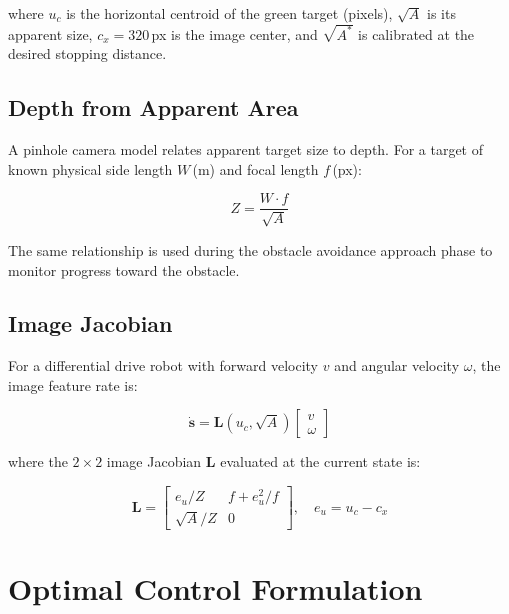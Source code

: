 \documentclass[journal, 10pt]{IEEEtran}
\begin{document}
where $u_c$ is the horizontal centroid of the green target (pixels),
$\sqrt{A}$ is its apparent size, $c_x = 320$\,px is the image center, and
$\sqrt{A^*}$ is calibrated at the desired stopping distance.

\subsection{Depth from Apparent Area}

A pinhole camera model relates apparent target size to depth. For a target
of known physical side length $W$\,(m) and focal length $f$\,(px):

\begin{equation}
  Z = \frac{W \cdot f}{\sqrt{A}}
  \label{eq:depth}
\end{equation}

The same relationship is used during the obstacle avoidance approach phase
to monitor progress toward the obstacle.

\subsection{Image Jacobian}

For a differential drive robot with forward velocity $v$ and angular
velocity $\omega$, the image feature rate is:

\begin{equation}
  \dot{\mathbf{s}} = \mathbf{L}(u_c, \sqrt{A}) \begin{bmatrix} v \\ \omega \end{bmatrix}
\end{equation}

where the $2\times2$ image Jacobian $\mathbf{L}$ evaluated at the current
state is:

\begin{equation}
  \mathbf{L} = \begin{bmatrix}
    e_u/Z & f + e_u^2/f \\
    \sqrt{A}/Z & 0
  \end{bmatrix}, \quad e_u = u_c - c_x
  \label{eq:jacobian}
\end{equation}

\section{Optimal Control Formulation}
\label{sec:control}
\end{document}
